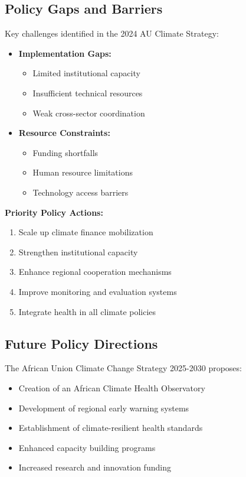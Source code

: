 \subsection{Policy Gaps and Barriers}
Key challenges identified in the 2024 AU Climate Strategy:

\begin{itemize}
    \item \textbf{Implementation Gaps:}
    \begin{itemize}
        \item Limited institutional capacity
        \item Insufficient technical resources
        \item Weak cross-sector coordination
    \end{itemize}
    
    \item \textbf{Resource Constraints:}
    \begin{itemize}
        \item Funding shortfalls
        \item Human resource limitations
        \item Technology access barriers
    \end{itemize}
\end{itemize}

\begin{recommendation}
\textbf{Priority Policy Actions:}
\begin{enumerate}
    \item Scale up climate finance mobilization
    \item Strengthen institutional capacity
    \item Enhance regional cooperation mechanisms
    \item Improve monitoring and evaluation systems
    \item Integrate health in all climate policies
\end{enumerate}
\end{recommendation}

\subsection{Future Policy Directions}
The African Union Climate Change Strategy 2025-2030 proposes:

\begin{itemize}
    \item Creation of an African Climate Health Observatory
    \item Development of regional early warning systems
    \item Establishment of climate-resilient health standards
    \item Enhanced capacity building programs
    \item Increased research and innovation funding
\end{itemize}


